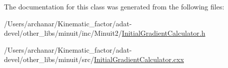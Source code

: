 The documentation for this class was generated from the following files\+:\begin{DoxyCompactItemize}
\item 
/\+Users/archanar/\+Kinematic\+\_\+factor/adat-\/devel/other\+\_\+libs/minuit/inc/\+Minuit2/\mbox{\hyperlink{adat-devel_2other__libs_2minuit_2inc_2Minuit2_2InitialGradientCalculator_8h}{Initial\+Gradient\+Calculator.\+h}}\item 
/\+Users/archanar/\+Kinematic\+\_\+factor/adat-\/devel/other\+\_\+libs/minuit/src/\mbox{\hyperlink{adat-devel_2other__libs_2minuit_2src_2InitialGradientCalculator_8cxx}{Initial\+Gradient\+Calculator.\+cxx}}\end{DoxyCompactItemize}
